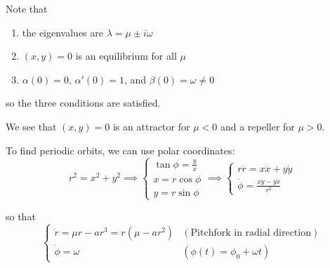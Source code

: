 \documentclass[12pt]{report}
\begin{document}
Note that
\begin{enumerate}
    \item the eigenvalues are $\lambda = \mu \pm i \omega$
    \item $(x, y) = 0$ is an equilibrium for all $\mu$
    \item $\alpha(0) = 0$, $\alpha'(0) = 1$, and $\beta(0) = \omega \neq 0$
\end{enumerate}
so the three conditions are satisfied.

We see that $(x, y) = 0$ is an attractor for $\mu < 0$ and a repeller for $\mu > 0$.

To find periodic orbits, we can use polar coordinates:
\[r^2 = x^2 + y^2 \implies \begin{cases}
        \tan \phi = \frac{y}{x} \\
        x = r\cos \phi          \\
        y = r\sin \phi
    \end{cases} \implies \begin{cases}
        r\dot r = x\dot x + y\dot y \\
        \dot \phi = \frac{x\dot y - y \dot x}{r^2}
    \end{cases}\]

so that
\[\begin{cases}
        \dot r = \mu r - ar^3 = r(\mu - ar^2) & (\text{Pitchfork in radial direction}) \\
        \dot \phi = \omega                    & (\phi(t) = \phi_0 + \omega t)
    \end{cases}\]
\end{document}
